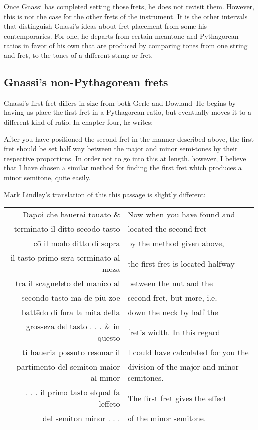 Once Gnassi has completed setting those frets, he does not revisit them.  However, this is not the case
for the other frets of the instrument.  It is the other intervals that
distinguish Gnassi's ideas about fret placement from some his contemporaries.  For one, he
departs from certain meantone and Pythagorean ratios in favor of his own that are produced by
comparing tones from one string and fret, to the tones of a different string or fret.

\subsection{Gnassi's non-Pythagorean frets}

Gnassi's first fret differs in size from both Gerle and Dowland.  He begins by
having us place the first fret in a Pythagorean ratio, but eventually moves it to
a different kind of ratio.  In chapter four, he writes:

\begin{blocks}
After you have positioned the second fret in the manner described above, the
first fret should be set half way between the major and minor semi-tones by
their respective proportions.  In order not to go into this at length, however,
I believe that I have chosen a similar method for finding the first fret which
produces a minor semitone, quite easily.\autocite[106]{RB:2}
\end{blocks}

Mark Lindley's translation of this this passage is slightly different:

\begin{blocks}
\begin{center}
\begin{tabular}{r l}
Dapoi che hauerai touato \&            & Now when you have found and \\
terminato il ditto sec\={o}do tasto    & located the second fret \\
c\={o} il modo ditto di sopra          & by the method given above, \\
il tasto primo sera terminato al meza  & the first fret is located halfway  \\
tra il scagneleto del manico al        & between the nut and the  \\
secondo tasto ma de piu zoe            & second fret, but more, i.e.  \\
batt\={e}do di fora la mita della      & down the neck by half the \\
grosseza del tasto . . . \& in questo  & fret's width.  In this regard \\
ti haueria possuto resonar il          & I could have calculated for you the \\
partimento del semiton maior al minor  & division of the major and minor semitones. \\
. . . il primo tasto elqual fa leffeto & The first fret gives the effect \\
del semiton minor . . .                & of the minor semitone. \\
\end{tabular}
\end{center}
\end{blocks}

